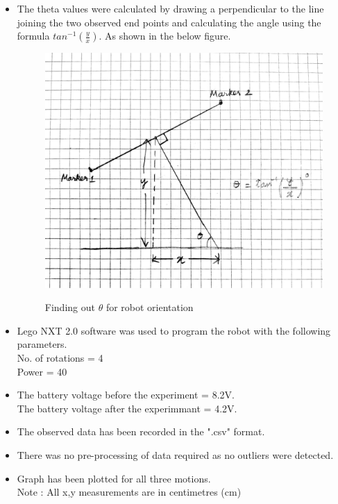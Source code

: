 \documentclass[11pt,a4paper]{article}
\begin{document}
\begin{itemize}
		\item The theta values were calculated by drawing a perpendicular to the line joining the two observed end points and calculating the angle using the formula $tan^{-1}(\frac{y}{x})$. As shown in the below figure.
		\begin{figure}[H]
			\centering	
			\includegraphics[width=1.2\linewidth]{theta_calc.jpeg}
			\label{fig:theta_calc}
			\caption{Finding out $\theta$ for robot orientation}
		\end{figure}
		\item Lego NXT 2.0 software was used to program the robot with the following parameters.\\
		No. of rotations = 4\\ 
		Power = 40
		\item {The battery voltage before the experiment = 8.2V. \\ The battery voltage after the experimmant = 4.2V.}
		\item The observed data has been recorded in the ".csv" format.
		\item There was no pre-processing of data required as no outliers were detected.
		\item Graph has been plotted for all three motions. \\
		Note : All x,y measurements are in centimetres (cm)

\end{itemize}
\end{document}
